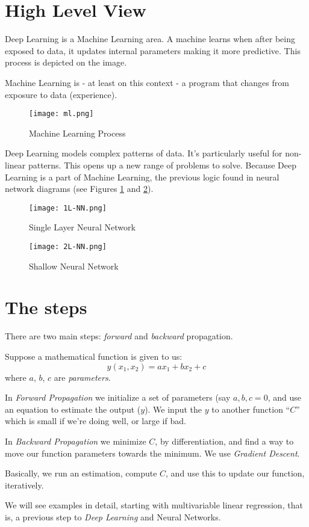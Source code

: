 \section{High Level View}
Deep Learning is a Machine Learning area. A machine learns when after being exposed to data, it updates internal parameters making it more predictive. This process is depicted on the image. 

Machine Learning is - at least on this context -  a program that changes from exposure to data (experience).

\begin{figure}[h]
 \centering
 \texttt{[image: ml.png]}
 \caption{Machine Learning Process}
\end{figure}

Deep Learning models complex patterns of data. It's particularly useful for non-linear patterns. This opens up a new range of problems to solve. Because Deep Learning is a part of Machine Learning, the previous logic found in neural network diagrams (see Figures \ref{fig:single} and \ref{fig:shallow}).


\begin{figure}
 \centering
 \texttt{[image: 1L-NN.png]}
 \caption{Single Layer Neural Network}
 \label{fig:single}
\end{figure}


\begin{figure}
 \centering
 \texttt{[image: 2L-NN.png]}
 \caption{Shallow Neural Network}
 \label{fig:shallow}
\end{figure}

\section{The steps}
There are two main steps: \textit{forward} and \textit{backward} propagation. 

Suppose a mathematical function is given to us:
$$ y(x_1,x_2) = a x_1 + b x_2 + c$$
where $a$, $b$, $c$ are \textit{parameters}.

In \textit{Forward Propagation} we initialize a set of parameters (say $a,b,c=0$, and use an equation to estimate the output ($y$). We input the $y$ to another function ``$C$'' which is small if we're doing well, or large if bad.

In \textit{Backward Propagation} we minimize $C$, by differentiation, and find a way to move our function parameters towards the minimum. We use \textit{Gradient Descent}.

Basically, we run an estimation, compute $C$, and use this to update our function, iteratively.

We will see examples in detail, starting with multivariable linear regression, that is, a previous step to \textit{Deep Learning} and Neural Networks.
